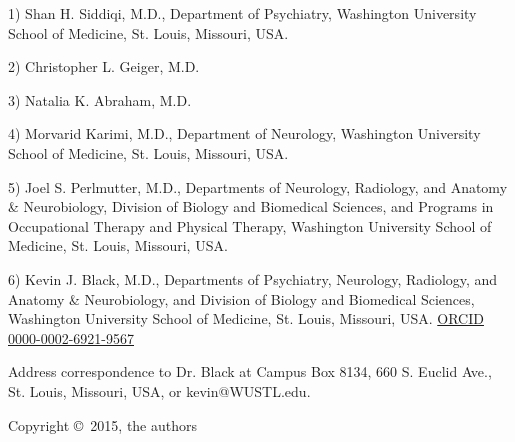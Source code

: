 1) Shan H. Siddiqi, M.D., Department of Psychiatry, Washington University School of Medicine, St. Louis, Missouri, USA.

2) Christopher L. Geiger, M.D.

3) Natalia K. Abraham, M.D.

4) Morvarid Karimi, M.D., Department of Neurology, Washington University School of Medicine, St. Louis, Missouri, USA.

5) Joel S. Perlmutter, M.D., Departments of Neurology, Radiology, and Anatomy & Neurobiology, Division of Biology and Biomedical Sciences, and Programs in Occupational Therapy and Physical Therapy, Washington University School of Medicine, St. Louis, Missouri, USA.

6) Kevin J. Black, M.D., Departments of Psychiatry, Neurology, Radiology, and Anatomy \& Neurobiology, and Division of Biology and Biomedical Sciences, Washington University School of Medicine, St. Louis, Missouri, USA.  \href{http://orcid.org/0000-0002-6921-9567}{ORCID 0000-0002-6921-9567}

Address correspondence to Dr. Black at Campus Box 8134, 660 S. Euclid Ave., St. Louis, Missouri, USA, or kevin@WUSTL.edu.

Copyright \copyright\, 2015, the authors